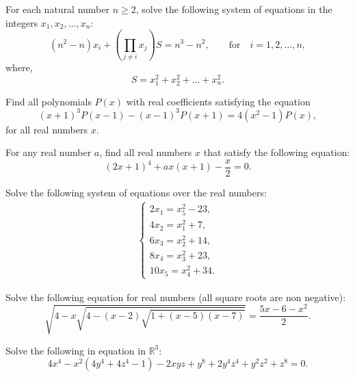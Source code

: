 \documentclass[12pt,a4paper]{memoir}
\theoremstyle{definition}
\begin{document}
\begin{question}[name={2005 Austrian--Polish}]
	For each natural number $n\geq 2$, solve the following system of equations in the integers $x_1, x_2, \dots, x_n$: $$(n^2-n)x_i+\left(\prod_{j\neq i}x_j\right)S=n^3-n^2,\qquad \text{for} \quad i=1,2,\dots, n,$$ where, $$S=x_1^2+x_2^2+\dots+x_n^2.$$
\end{question}

\begin{question}[name={2006 Austrian--Polish}]
	Find all polynomials $P(x)$ with real coefficients satisfying the equation \[(x+1)^{3}P(x-1)-(x-1)^{3}P(x+1)=4(x^{2}-1) P(x),\] for all real numbers $x$.
\end{question}



\begin{question}[name={2000 Austria}]
	For any real number $a$, find all real numbers $x$ that satisfy the following equation: $$(2x + 1)^4 + ax(x + 1) - \frac{x}{2}= 0.$$
\end{question}


\begin{question}[name={2002 Austria}]
	Solve the following system of equations over the real numbers:
	\begin{align*}
		\begin{cases}
			2x_1 = x_5 ^2 - 23,\\
			4x_2 = x_1 ^2 + 7,\\
			6x_3 = x_2 ^2 + 14,\\
			8x_4 = x_3 ^2 + 23,\\
			10x_5 = x_4 ^2 + 34.
		\end{cases}
	\end{align*}
\end{question}


\begin{question}[name={2004 Austria}]
	Solve the following equation for real numbers (all square roots are non negative):
	\[\sqrt{4-x\sqrt{4-(x-2)\sqrt{1+(x-5)(x-7)}}}=\frac{5x-6-x^2}{2}.\]
\end{question}


\begin{question}[name={2010 Austria}]
	Solve the following in equation in $\mathbb{R}^3$:
	\[4x^4-x^2(4y^4+4z^4-1)-2xyz+y^8+2y^4z^4+y^2z^2+z^8=0.\]
\end{question}
\end{document}
